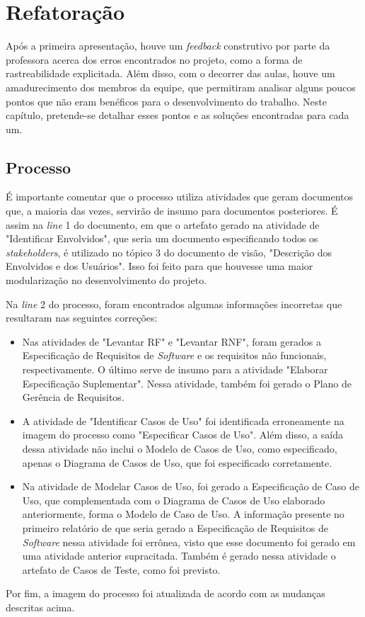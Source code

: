 \chapter{Refatoração}
\label{refactor}

Após a primeira apresentação, houve um \textit{feedback} construtivo por parte da professora acerca dos erros encontrados no projeto, como a forma de rastreabilidade explicitada. Além disso, com o decorrer das aulas, houve um amadurecimento dos membros da equipe, que permitiram analisar alguns poucos pontos que não eram benéficos para o desenvolvimento do trabalho. Neste capítulo, pretende-se detalhar esses pontos e as soluções encontradas para cada um.

\section{Processo}

É importante comentar que o processo utiliza atividades que geram documentos que, a maioria das vezes, servirão de insumo para documentos posteriores. É assim na \textit{line} 1 do documento, em que o artefato gerado na atividade de "Identificar Envolvidos", que seria um documento especificando todos os \textit{stakeholders}, é utilizado no tópico 3 do documento de visão, "Descrição dos Envolvidos e dos Usuários". Isso foi feito para que houvesse uma maior modularização no desenvolvimento do projeto.

Na \textit{line} 2 do processo, foram encontrados algumas informações incorretas que resultaram nas seguintes correções:

\begin{itemize}
\item Nas atividades de "Levantar RF" e "Levantar RNF", foram gerados a Especificação de Requisitos de \textit{Software} e os requisitos não funcionais, respectivamente. O último serve de insumo para a atividade "Elaborar Especificação Suplementar". Nessa atividade, também foi gerado o Plano de Gerência de Requisitos.
\item A atividade de "Identificar Casos de Uso" foi identificada erroneamente na imagem do processo como "Especificar Casos de Uso". Além disso, a saída dessa atividade não inclui o Modelo de Casos de Uso, como especificado, apenas o Diagrama de Casos de Uso, que foi especificado corretamente.
\item Na atividade de Modelar Casos de Uso, foi gerado a Especificação de Caso de Uso, que complementada com o Diagrama de Casos de Uso elaborado anteriormente, forma o Modelo de Caso de Uso. A informação presente no primeiro relatório de que seria gerado a Especificação de Requisitos de \textit{Software} nessa atividade foi errônea, visto que esse documento foi gerado em uma atividade anterior supracitada. Também é gerado nessa atividade o artefato de Casos de Teste, como foi previsto.
\end{itemize}

Por fim, a imagem do processo foi atualizada de acordo com as mudanças descritas acima.
